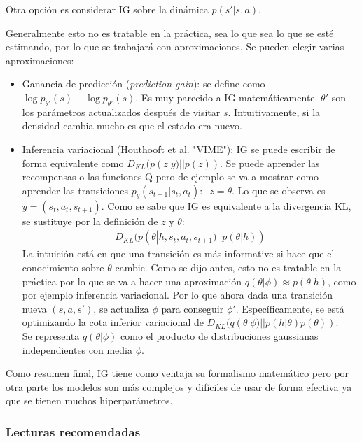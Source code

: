 Otra opción es considerar IG sobre la dinámica  $p(s'|s,a)$.

Generalmente esto no es tratable en la práctica, sea lo que sea lo que se esté estimando, por
lo que se trabajará con aproximaciones. Se pueden elegir varias aproximaciones:
 \begin{itemize}
     \item Ganancia de predicción (\textit{prediction gain}): se define como $\log
         p_{\theta'}(s)-\log p_{\theta'}(s)$. Es muy parecido a IG matemáticamente.
         $\theta'$ son los parámetros actualizados después de visitar $s$. Intuitivamente, si
         la densidad cambia mucho es que el estado era nuevo. 
     \item Inferencia variacional (Houthooft et al. "VIME"): IG se puede escribir de forma
         equivalente como $D_{KL}(p(z|y)||p(z))$. Se puede aprender las recompensas o las
         funciones Q pero de ejemplo se va a mostrar como aprender las transiciones
         $p_\theta(s_{t+1}|s_t,a_t):\;\;z=\theta$. Lo que se observa es
         $y=(s_t,a_t,s_{t+1})$. Como se sabe que IG es equivalente a la divergencia KL, se
         sustituye por la definición de  $z$ y $\theta$:
         \begin{align}
             D_{KL}(p(\theta|h,s_t,a_t,s_{t+1})||p(\theta|h))
         \end{align}
         La intuición está en que una transición es más informative si hace que el conocimiento
         sobre $\theta$ cambie. Como se dijo antes, esto no es tratable en la práctica por
         lo que se va a hacer una aproximación $q(\theta|\phi)\approx
         p(\theta|h)$, como por ejemplo inferencia variacional. Por lo que ahora dada una
         transición nueva $(s,a,s')$, se actualiza $\phi$ para conseguir $\phi'$.
         Específicamente, se está optimizando la cota inferior variacional de
         $D_{KL}(q(\theta|\phi)||p(h|\theta)p(\theta))$.\\
         Se representa $q(\theta|\phi)$ como el producto de distribuciones gaussianas
         independientes con media $\phi$.
\end{itemize}

Como resumen final, IG tiene como ventaja su formalismo matemático pero por otra parte los
modelos son más complejos y difíciles de usar de forma efectiva ya que se tienen muchos
hiperparámetros.

\subsubsection{Lecturas recomendadas}%
\label{ssub:lecturas_recomendadas}

